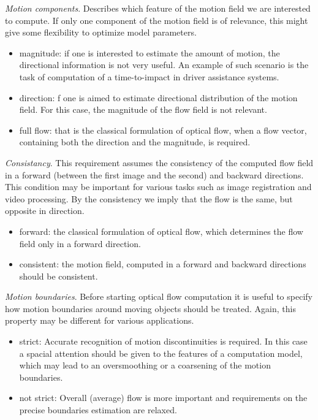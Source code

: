 \noindent \textit{Motion components}. Describes which feature of the motion field we are interested to compute. If only one component of the motion field is of relevance, this might give some flexibility to optimize model parameters.
\begin{itemize}
	\item magnitude: if one is interested to estimate the amount of motion, the directional information is not very useful. An example of such scenario is the task of computation of a time-to-impact in driver assistance systems.
	
	\item direction: f one is aimed to estimate directional distribution of the motion field. For this case, the magnitude of the flow field is not relevant.
	
	\item full flow: that is the classical formulation of optical flow, when a flow vector, containing both the direction and the magnitude, is required. 
\end{itemize}


\noindent \textit{Consistancy}. This requirement assumes the consistency of the computed flow field in a forward (between the first image and the second) and backward directions. This condition may be important for various tasks such as image registration and video processing. By the consistency we imply that the flow is the same, but opposite in direction.   
\begin{itemize}
	\item forward: the classical formulation of optical flow, which determines the flow field only in a forward direction.
	
	\item consistent: the motion field, computed in a forward and backward directions should be consistent.
\end{itemize}


\noindent \textit{Motion boundaries}. Before starting optical flow computation it is useful to specify how motion boundaries around moving objects should be treated. Again, this property may be different for various applications. 
\begin{itemize}
	\item strict: Accurate recognition of motion discontinuities is required. In this case a spacial attention should be given to the features of a computation model, which may lead to an oversmoothing or a coarsening of the motion boundaries.
	
	\item not strict: Overall (average) flow is more important and requirements on the precise boundaries estimation are relaxed.
\end{itemize}


